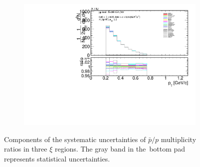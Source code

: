 \begin{figure}[h!]
\begin{subfigure}{.49\textwidth}
		\includegraphics[width=\textwidth,page=27]{chapters/chrgSTAR/img/syst/outPID_SDT.pdf}
	\end{subfigure}
	\begin{minipage}{.49\textwidth}
		\caption{Components of the systematic uncertainties of $\bar{p}/p$ multiplicity ratios  in three $\xi$ regions. The gray band in the~bottom pad represents statistical uncertainties.}
		\label{fig:results_star_syst_p}
	\end{minipage}
	\vspace{-2.5cm}
\end{figure}
\FloatBarrier
